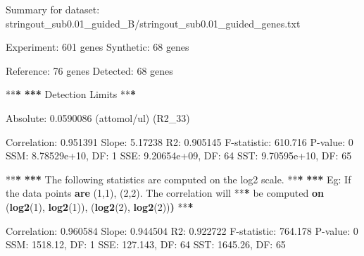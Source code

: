 \documentclass[]{article}
\newenvironment{Shaded}{\begin{snugshade}}{\end{snugshade}}
\newcommand{\KeywordTok}[1]{\textcolor[rgb]{0.13,0.29,0.53}{\textbf{{#1}}}}
\newcommand{\DecValTok}[1]{\textcolor[rgb]{0.00,0.00,0.81}{{#1}}}
\newcommand{\FloatTok}[1]{\textcolor[rgb]{0.00,0.00,0.81}{{#1}}}
\newcommand{\StringTok}[1]{\textcolor[rgb]{0.31,0.60,0.02}{{#1}}}
\newcommand{\ErrorTok}[1]{\textbf{{#1}}}
\newcommand{\NormalTok}[1]{{#1}}
\begin{document}
\begin{Shaded}
\begin{Highlighting}[]
\NormalTok{Summary for dataset:}\StringTok{ }\NormalTok{stringout_sub0.01_guided_B/stringout_sub0.01_guided_genes.txt}

   \NormalTok{Experiment:}\StringTok{  }\DecValTok{601} \NormalTok{genes}
   \NormalTok{Synthetic:}\StringTok{   }\DecValTok{68} \NormalTok{genes}

   \NormalTok{Reference:}\StringTok{   }\DecValTok{76} \NormalTok{genes}
   \NormalTok{Detected:}\StringTok{    }\DecValTok{68} \NormalTok{genes}

   \NormalTok{**}\ErrorTok{*}
\StringTok{   }\ErrorTok{***}\StringTok{ }\NormalTok{Detection Limits}
   \NormalTok{**}\ErrorTok{*}

\StringTok{   }\NormalTok{Absolute:}\StringTok{    }\FloatTok{0.0590086} \NormalTok{(attomol/ul) (R2_33)}

   \NormalTok{Correlation:}\StringTok{ }\FloatTok{0.951391}
   \NormalTok{Slope:}\StringTok{       }\FloatTok{5.17238}
   \NormalTok{R2:}\StringTok{          }\FloatTok{0.905145}
   \NormalTok{F-statistic:}\StringTok{ }\FloatTok{610.716}
   \NormalTok{P-value:}\StringTok{     }\DecValTok{0}
   \NormalTok{SSM:}\StringTok{         }\FloatTok{8.78529e+10}\NormalTok{, DF:}\StringTok{ }\DecValTok{1}
   \NormalTok{SSE:}\StringTok{         }\FloatTok{9.20654e+09}\NormalTok{, DF:}\StringTok{ }\DecValTok{64}
   \NormalTok{SST:}\StringTok{         }\FloatTok{9.70595e+10}\NormalTok{, DF:}\StringTok{ }\DecValTok{65}

   \NormalTok{**}\ErrorTok{*}
\StringTok{   }\ErrorTok{***}\StringTok{ }\NormalTok{The following statistics are computed on the log2 scale.}
   \NormalTok{**}\ErrorTok{*}
\StringTok{   }\ErrorTok{***}\StringTok{   }\NormalTok{Eg:}\StringTok{ }\NormalTok{If the data points }\KeywordTok{are} \NormalTok{(}\DecValTok{1}\NormalTok{,}\DecValTok{1}\NormalTok{), (}\DecValTok{2}\NormalTok{,}\DecValTok{2}\NormalTok{). The correlation will}
   \NormalTok{**}\ErrorTok{*}\StringTok{       }\NormalTok{be computed }\KeywordTok{on} \NormalTok{(}\KeywordTok{log2}\NormalTok{(}\DecValTok{1}\NormalTok{), }\KeywordTok{log2}\NormalTok{(}\DecValTok{1}\NormalTok{)), (}\KeywordTok{log2}\NormalTok{(}\DecValTok{2}\NormalTok{), }\KeywordTok{log2}\NormalTok{(}\DecValTok{2}\NormalTok{))}\ErrorTok{)}
   \NormalTok{**}\ErrorTok{*}

\StringTok{   }\NormalTok{Correlation:}\StringTok{ }\FloatTok{0.960584}
   \NormalTok{Slope:}\StringTok{       }\FloatTok{0.944504}
   \NormalTok{R2:}\StringTok{          }\FloatTok{0.922722}
   \NormalTok{F-statistic:}\StringTok{ }\FloatTok{764.178}
   \NormalTok{P-value:}\StringTok{     }\DecValTok{0}
   \NormalTok{SSM:}\StringTok{         }\FloatTok{1518.12}\NormalTok{, DF:}\StringTok{ }\DecValTok{1}
   \NormalTok{SSE:}\StringTok{         }\FloatTok{127.143}\NormalTok{, DF:}\StringTok{ }\DecValTok{64}
   \NormalTok{SST:}\StringTok{         }\FloatTok{1645.26}\NormalTok{, DF:}\StringTok{ }\DecValTok{65}
\end{Highlighting}
\end{Shaded}
\end{document}
